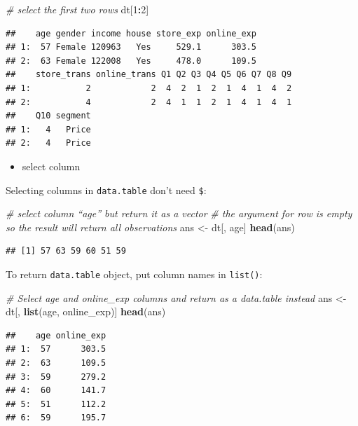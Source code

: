 \documentclass[12pt,]{krantz}
\newenvironment{Shaded}{\begin{snugshade}}{\end{snugshade}}
\newcommand{\KeywordTok}[1]{\textcolor[rgb]{0.13,0.29,0.53}{\textbf{#1}}}
\newcommand{\DecValTok}[1]{\textcolor[rgb]{0.00,0.00,0.81}{#1}}
\newcommand{\StringTok}[1]{\textcolor[rgb]{0.31,0.60,0.02}{#1}}
\newcommand{\CommentTok}[1]{\textcolor[rgb]{0.56,0.35,0.01}{\textit{#1}}}
\newcommand{\OperatorTok}[1]{\textcolor[rgb]{0.81,0.36,0.00}{\textbf{#1}}}
\newcommand{\NormalTok}[1]{#1}
\providecommand{\tightlist}{%
  \setlength{\itemsep}{0pt}\setlength{\parskip}{0pt}}
\theoremstyle{definition}
\theoremstyle{definition}
\theoremstyle{definition}
\theoremstyle{remark}
\begin{document}
\begin{Shaded}
\begin{Highlighting}[]
\CommentTok{# select the first two rows}
\NormalTok{dt[}\DecValTok{1}\OperatorTok{:}\DecValTok{2}\NormalTok{]}
\end{Highlighting}
\end{Shaded}

\begin{verbatim}
##    age gender income house store_exp online_exp
## 1:  57 Female 120963   Yes     529.1      303.5
## 2:  63 Female 122008   Yes     478.0      109.5
##    store_trans online_trans Q1 Q2 Q3 Q4 Q5 Q6 Q7 Q8 Q9
## 1:           2            2  4  2  1  2  1  4  1  4  2
## 2:           4            2  4  1  1  2  1  4  1  4  1
##    Q10 segment
## 1:   4   Price
## 2:   4   Price
\end{verbatim}

\begin{itemize}
\tightlist
\item
  select column
\end{itemize}

Selecting columns in \texttt{data.table} don't need \texttt{\$}:

\begin{Shaded}
\begin{Highlighting}[]
\CommentTok{# select column “age” but return it as a vector}
\CommentTok{# the argument for row is empty so the result will return all observations}
\NormalTok{ans <-}\StringTok{ }\NormalTok{dt[, age]}
\KeywordTok{head}\NormalTok{(ans)}
\end{Highlighting}
\end{Shaded}

\begin{verbatim}
## [1] 57 63 59 60 51 59
\end{verbatim}

To return \texttt{data.table} object, put column names in
\texttt{list()}:

\begin{Shaded}
\begin{Highlighting}[]
\CommentTok{# Select age and online_exp columns and return as a data.table instead}
\NormalTok{ans <-}\StringTok{ }\NormalTok{dt[, }\KeywordTok{list}\NormalTok{(age, online_exp)]}
\KeywordTok{head}\NormalTok{(ans)}
\end{Highlighting}
\end{Shaded}

\begin{verbatim}
##    age online_exp
## 1:  57      303.5
## 2:  63      109.5
## 3:  59      279.2
## 4:  60      141.7
## 5:  51      112.2
## 6:  59      195.7
\end{verbatim}
\end{document}
